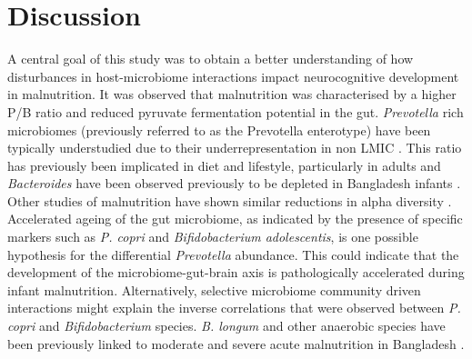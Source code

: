 \documentclass{article}
\begin{document}
\section*{Discussion}
A central goal of this study was to obtain a better understanding of how disturbances in host-microbiome interactions impact neurocognitive development in malnutrition.
It was observed that malnutrition was characterised by a higher \gls{P/B} ratio and reduced pyruvate fermentation potential in the gut.
\textit{Prevotella} rich microbiomes (previously referred to as the Prevotella enterotype) have been typically understudied due to their underrepresentation in non \gls{LMIC} \cite{tett2019prevotella}.
This ratio has previously been implicated in diet and lifestyle, particularly in adults \cite{hjorth2019prevotella} and \textit{Bacteroides} have been observed previously to be depleted in Bangladesh infants \cite{roger2022impact}.
Other studies of malnutrition have shown similar reductions in alpha diversity \cite{roger2022impact}.
Accelerated ageing of the gut microbiome, as indicated by the presence of specific markers such as \textit{P. copri} and \textit{Bifidobacterium adolescentis}, is one possible hypothesis for the differential \textit{Prevotella} abundance.
This could indicate that the development of the microbiome-gut-brain axis is pathologically accelerated during infant malnutrition.
Alternatively, selective microbiome community driven interactions might explain the inverse correlations that were observed between \textit{P. copri} and \textit{Bifidobacterium} species.
\textit{B. longum} and other anaerobic species have been previously linked to moderate and severe acute malnutrition in Bangladesh \cite{barratt2022bifidobacterium,  million2016increased}.
\end{document}

